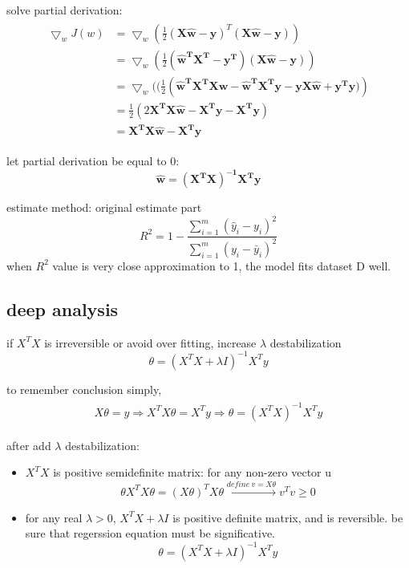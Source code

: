 \documentclass[12pt]{ctexart}%
\begin{document}
	solve partial derivation:
	\begin{align}
	\begin{split}
    \bigtriangledown_wJ(w) &= \bigtriangledown_w(\frac{1}{2}(\boldsymbol{X\hat{w}} - \boldsymbol{y})^T(\boldsymbol{X\hat{w}} - \boldsymbol{y}))\\
    &= \bigtriangledown_w(\frac{1}{2}(\boldsymbol{\hat{w}^TX^T} - \boldsymbol{y^T})(\boldsymbol{X\hat{w}} - \boldsymbol{y}))\\
    &= \bigtriangledown_w((\frac{1}{2}(\boldsymbol{\hat{w}^TX^TXw} - \boldsymbol{\hat{w}^TX^Ty} - \boldsymbol{yX\hat{w}} + \boldsymbol{y^Ty)})\\
    &= \frac{1}{2}(2\boldsymbol{X^TX\hat{w}} - \boldsymbol{X^Ty} -\boldsymbol{X^Ty})\\
    &= \boldsymbol{X^TX\hat{w}} - \boldsymbol{X^Ty}
	\end{split}
	\end{align}
	
	let partial derivation be equal to 0:
	\begin{equation}
	\boldsymbol{\hat{w}} = \boldsymbol{(X^TX)^{-1}X^Ty}
	\end{equation} 
	
	estimate method:
	original estimate part 
	\begin{equation}
	R^2 = 1-\frac{\sum_{i=1}^{m}(\hat{y}_i - y_i)^2}{\sum_{i=1}^{m}(y_i - \bar{y}_i)^2}
	\end{equation}
	when $R^2$ value is very close approximation to 1, the model fits dataset D well.
	
	\subsection{\quad deep analysis}
	if $X^TX$ is irreversible or avoid over fitting, increase $\lambda$ destabilization
	\begin{equation}
	\theta = (X^TX + \lambda I)^{-1}X^Ty
	\end{equation} 
	
	to remember conclusion simply,
	\begin{align}
		\begin{split}
		X\theta = y \Rightarrow X^TX\theta = X^Ty \Rightarrow \theta = (X^TX)^{-1}X^Ty
		\end{split}
	\end{align}
	
	after add $\lambda$ destabilization:
	\begin{itemize}
		\item $X^TX$ is positive semidefinite matrix: for any non-zero vector u
		\begin{equation}
			\theta X^T X \theta = (X \theta)^T X \theta \overset{define\  v = X \theta}{  \longrightarrow} v^T v \geq 0
		\end{equation}
		\item for any real $\lambda > 0$, $X^T X + \lambda I$ is positive definite matrix, and is reversible. be sure that regerssion equation must be significative.
		\begin{equation}\theta = (X^T X + \lambda I)^{-1} X^T y\end{equation}
	\end{itemize}
\end{document}
